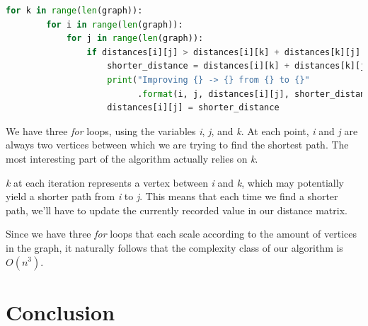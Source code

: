 \documentclass{article}
\begin{document}
\begin{lstlisting}[language=Python]
  for k in range(len(graph)):
        for i in range(len(graph)):
            for j in range(len(graph)):
                if distances[i][j] > distances[i][k] + distances[k][j]:
                    shorter_distance = distances[i][k] + distances[k][j]
                    print("Improving {} -> {} from {} to {}"
                          .format(i, j, distances[i][j], shorter_distance))
                    distances[i][j] = shorter_distance
\end{lstlisting}

We have three {\em for} loops, using the variables {\em i}, {\em j}, and {\em k}.
At each point, {\em i} and {\em j} are always two vertices between which we are trying to find the shortest path. The most interesting part of the algorithm actually relies on {\em k}.

{\em k} at each iteration represents a vertex between {\em i} and {\em k}, which may potentially yield a shorter path from {\em i} to {\em j}. This means that each time we find a shorter path, we'll have to update the currently recorded value in our distance matrix.

Since we have three {\em for} loops that each scale according to the amount of vertices in the graph,
it naturally follows that the complexity class of our algorithm is \(O(n^3)\).

\newpage

\section{Conclusion}
\end{document}
